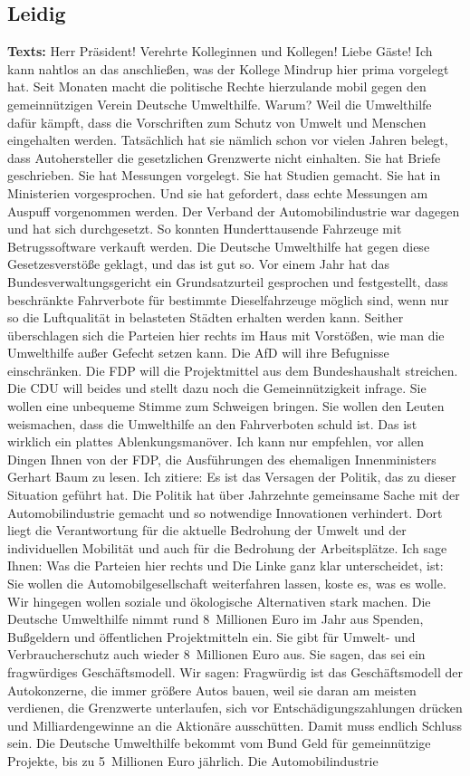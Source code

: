 \documentclass{article}
\begin{document}
\subsection{Leidig}
\noindent\textbf{Texts:} Herr Präsident! Verehrte Kolleginnen und Kollegen! Liebe Gäste! Ich kann nahtlos an das anschließen, was der Kollege Mindrup hier prima vorgelegt hat. Seit Monaten macht die politische Rechte hierzulande mobil gegen den gemeinnützigen Verein Deutsche Umwelthilfe.  Warum? Weil die Umwelthilfe dafür kämpft, dass die Vorschriften zum Schutz von Umwelt und Menschen eingehalten werden. Tatsächlich hat sie nämlich schon vor vielen Jahren belegt, dass Autohersteller die gesetzlichen Grenzwerte nicht einhalten. Sie hat Briefe geschrieben. Sie hat Messungen vorgelegt. Sie hat Studien gemacht. Sie hat in Ministerien vorgesprochen. Und sie hat gefordert, dass echte Messungen am Auspuff vorgenommen werden. Der Verband der Automobilindustrie war dagegen und hat sich durchgesetzt. So konnten Hunderttausende Fahrzeuge mit Betrugssoftware verkauft werden. Die Deutsche Umwelthilfe hat gegen diese Gesetzesverstöße geklagt, und das ist gut so.  Vor einem Jahr hat das Bundesverwaltungsgericht ein Grundsatzurteil gesprochen und festgestellt, dass beschränkte Fahrverbote für bestimmte Dieselfahrzeuge möglich sind, wenn nur so die Luftqualität in belasteten Städten erhalten werden kann. Seither überschlagen sich die Parteien hier rechts im Haus mit Vorstößen, wie man die Umwelthilfe außer Gefecht setzen kann. Die AfD will ihre Befugnisse einschränken. Die FDP will die Projektmittel aus dem Bundeshaushalt streichen. Die CDU will beides und stellt dazu noch die Gemeinnützigkeit infrage.  Sie wollen eine unbequeme Stimme zum Schweigen bringen. Sie wollen den Leuten weismachen, dass die Umwelthilfe an den Fahrverboten schuld ist. Das ist wirklich ein plattes Ablenkungsmanöver.  Ich kann nur empfehlen, vor allen Dingen Ihnen von der FDP, die Ausführungen des ehemaligen Innenministers Gerhart Baum zu lesen. Ich zitiere: Es ist das Versagen der Politik, das zu dieser Situation geführt hat. Die Politik hat über Jahrzehnte gemeinsame Sache mit der Automobilindustrie gemacht und so notwendige Innovationen verhindert. Dort liegt die Verantwortung für die aktuelle Bedrohung der Umwelt und der individuellen Mobilität und auch für die Bedrohung der Arbeitsplätze.  Ich sage Ihnen: Was die Parteien hier rechts und Die Linke ganz klar unterscheidet, ist: Sie wollen die Automobilgesellschaft weiterfahren lassen,  koste es, was es wolle. Wir hingegen wollen soziale und ökologische Alternativen stark machen.  Die Deutsche Umwelthilfe nimmt rund 8 Millionen Euro im Jahr aus Spenden, Bußgeldern und öffentlichen Projektmitteln ein. Sie gibt für Umwelt- und Verbraucherschutz auch wieder 8 Millionen Euro aus. Sie sagen, das sei ein fragwürdiges Geschäftsmodell. Wir sagen: Fragwürdig ist das Geschäftsmodell der Autokonzerne,  die immer größere Autos bauen, weil sie daran am meisten verdienen, die Grenzwerte unterlaufen, sich vor Entschädigungszahlungen drücken und Milliardengewinne an die Aktionäre ausschütten. Damit muss endlich Schluss sein.  Die Deutsche Umwelthilfe bekommt vom Bund Geld für gemeinnützige Projekte, bis zu 5 Millionen Euro jährlich. Die Automobilindustrie 
\end{document}
